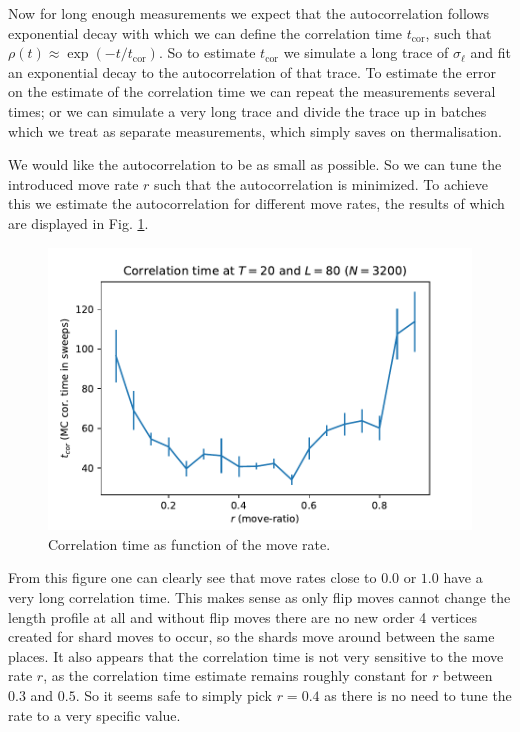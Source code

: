 Now for long enough measurements we expect that the autocorrelation follows exponential decay with which we can define the correlation time $t_\text{cor}$, such that $\rho(t) \approx \exp(- t / t_\text{cor})$.
So to estimate $t_\text{cor}$ we simulate a long trace of $\sigma_\ell$ and fit an exponential decay to the autocorrelation of that trace.
To estimate the error on the estimate of the correlation time we can repeat the measurements several times; or we can simulate a very long trace and divide the trace up in batches which we treat as separate measurements, which simply saves on thermalisation.

We would like the autocorrelation to be as small as possible. So we can tune the introduced move rate $r$ such that the autocorrelation is minimized.
To achieve this we estimate the autocorrelation for different move rates, the results of which are displayed in Fig. \ref{fig:tcor_rdep}.
\begin{figure}[ht]
    \centering
    \includegraphics[width=0.7\linewidth]{img/tcor_r_t20_l80.pdf}
    \caption{Correlation time as function of the move rate.}
    \label{fig:tcor_rdep}
\end{figure}
From this figure one can clearly see that move rates close to $0.0$ or $1.0$ have a very long correlation time.
This makes sense as only flip moves cannot change the length profile at all and without flip moves there are no new order 4 vertices created for shard moves to occur, so the shards move around between the same places.
It also appears that the correlation time is not very sensitive to the move rate $r$, as the correlation time estimate remains roughly constant for $r$ between $0.3$ and $0.5$.
So it seems safe to simply pick $r = 0.4$ as there is no need to tune the rate to a very specific value.

